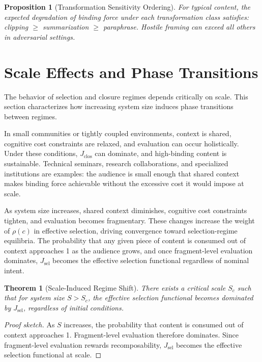 \documentclass[12pt]{article}
\newtheorem{theorem}{Theorem}[section]
\newtheorem{proposition}{Proposition}[section]
\newcommand{\recomp}{\rho}
\newcommand{\Jsel}{J_{\mathrm{sel}}}
\newcommand{\Jclos}{J_{\mathrm{clos}}}
\begin{document}
\begin{proposition}[Transformation Sensitivity Ordering]
\label{prop:transformorder}
For typical content, the expected degradation of binding force under
each transformation class satisfies: clipping $\geq$ summarization
$\geq$ paraphrase. Hostile framing can exceed all others in adversarial
settings.
\end{proposition}

\section{Scale Effects and Phase Transitions}
\label{sec:scale}

The behavior of selection and closure regimes depends critically on
scale. This section characterizes how increasing system size induces
phase transitions between regimes.

In small communities or tightly coupled environments, context is shared,
cognitive cost constraints are relaxed, and evaluation can occur
holistically. Under these conditions, $\Jclos$ can dominate, and
high-binding content is sustainable. Technical seminars, research
collaborations, and specialized institutions are examples: the audience
is small enough that shared context makes binding force achievable
without the excessive cost it would impose at scale.

As system size increases, shared context diminishes, cognitive cost
constraints tighten, and evaluation becomes fragmentary. These changes
increase the weight of $\recomp(c)$ in effective selection, driving
convergence toward selection-regime equilibria. The probability that any
given piece of content is consumed out of context approaches 1 as the
audience grows, and once fragment-level evaluation dominates, $\Jsel$
becomes the effective selection functional regardless of nominal intent.

\begin{theorem}[Scale-Induced Regime Shift]
\label{thm:scale}
There exists a critical scale $S_c$ such that for system size $S > S_c$,
the effective selection functional becomes dominated by $\Jsel$,
regardless of initial conditions.
\end{theorem}

\begin{proof}[Proof sketch]
As $S$ increases, the probability that content is consumed out of
context approaches 1. Fragment-level evaluation therefore dominates. Since
fragment-level evaluation rewards recomposability, $\Jsel$ becomes the
effective selection functional at scale.
\end{proof}
\end{document}
